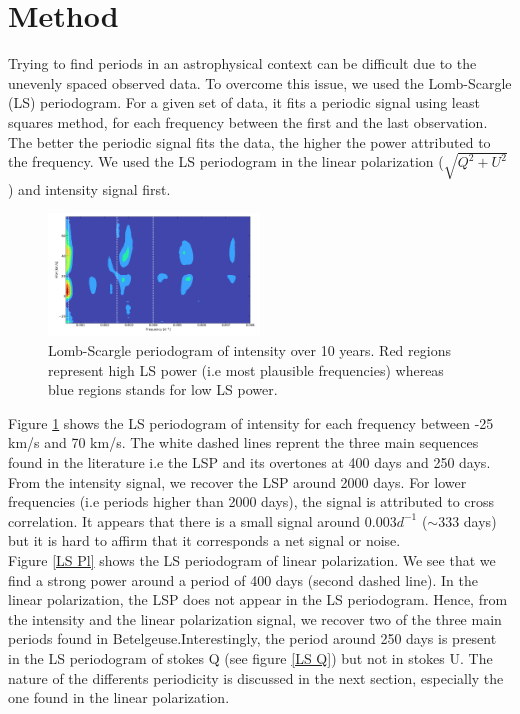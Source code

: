 \documentclass{aa}
\begin{document}
\section{Method}

Trying to find periods in an astrophysical context can be difficult due to the unevenly spaced observed data. To overcome this issue, we used the Lomb-Scargle (LS) periodogram. For a given set of data, it fits a periodic signal using least squares method, for each frequency between the first and the last observation. The better the periodic signal fits the data, the higher the power attributed to the frequency. We used the LS periodogram in the linear polarization ($\sqrt{Q^2+U^2}$) and intensity signal first. 

\begin{figure}[!h]
    \centering
    \includegraphics[width=0.5\textwidth]{LS Intensity.png}
    \caption{Lomb-Scargle periodogram of intensity over 10 years. Red regions represent high LS power (i.e most plausible frequencies) whereas blue regions stands for low LS power. }
    \label{LS Intensity}
\end{figure}

Figure \ref{LS Intensity} shows the LS periodogram of intensity for each frequency between -25 km/s and 70 km/s. The white dashed lines reprent the three main sequences found in the literature i.e the LSP and its overtones at 400 days and 250 days. From the intensity signal, we recover the LSP around 2000 days. For lower frequencies (i.e periods higher than 2000 days), the signal is attributed to cross correlation. It appears that there is a small signal around $0.003 d^{-1}$ ($\sim 333$ days) but it is hard to affirm that it corresponds a net signal or noise. \\

Figure \ref{LS Pl} shows the LS periodogram of linear polarization. We see that we find a strong power around a period of 400 days (second dashed line). In the linear polarization, the LSP does not appear in the LS periodogram. Hence, from the intensity and the linear polarization signal, we recover two of the three main periods found in Betelgeuse.Interestingly, the period around 250 days is present in the LS periodogram of stokes Q (see figure \ref{LS Q}) but not in stokes U. The nature of the differents periodicity is discussed in the next section, especially the one found in the linear polarization. 
\end{document}
